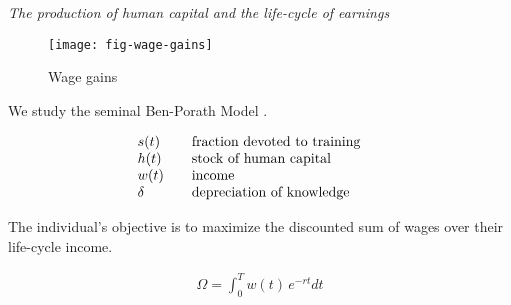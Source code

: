 \begin{frame}\begin{center}
		\LARGE\textit{The production of human capital and the life-cycle of earnings}
\end{center}\end{frame}
\begin{frame}
	\begin{figure}[htp]\centering
		\caption{Wage gains}\scalebox{0.35}
		{\texttt{[image: fig-wage-gains]}}
	\end{figure}
\end{frame}
\begin{frame}
We study the seminal Ben-Porath Model \cite{Ben-Porath.1967}.

\begin{align*}\begin{array}{l@{\qquad}l@{\qquad}l}
s(t) 	& \text{fraction devoted to training} \\
h(t)    & \text{stock of human capital} \\
w(t)	& \text{income} \\
\delta  & \text{depreciation of knowledge}
\end{array}\end{align*}
\end{frame}
\begin{frame}
The individual's objective is to maximize the discounted sum of wages over their life-cycle income.

\begin{align*}
\Omega = \int^T_0 w(t)\, e^{-r t} dt
\end{align*}
\end{frame}

